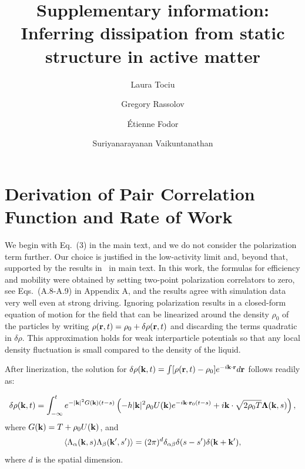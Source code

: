 \documentclass[superscriptaddress, amsmath,preprintnumbers,10pt,article,notitlepage]{revtex4-1}
\newcommand{\T}{T}
\newcommand{\U}{U}
\begin{document}
\title{Supplementary information: Inferring dissipation from static structure in active matter}

\author{Laura Tociu}
\author{Gregory Rassolov}

\author{\'Etienne Fodor}

\author{Suriyanarayanan Vaikuntanathan}

\maketitle

\section{Derivation of Pair Correlation Function and Rate of Work}
We begin with Eq.~(3) in the main text, and we do not consider the polarization term further. Our choice is justified in the low-activity limit and, beyond that, supported by the results in~\cite{Suri2020} in main text. In this work, the formulas for efficiency and mobility were obtained by setting two-point polarization correlators to zero, see Eqs.~(A.8-A.9) in Appendix A, and the results agree with simulation data very well even at strong driving. Ignoring polarization results in a closed-form equation of motion for the field that can be linearized around the density $\rho_0$ of the particles by writing $\rho ({\bf r}, t) = \rho_0 + \delta \rho({\bf r}, t)$ and discarding the terms quadratic in $\delta \rho$. This approximation holds for weak interparticle potentials so that any local density fluctuation is small compared to the density of the liquid. 

After linerization, the solution for $\delta \rho({\bf k}, t) = \int [ \rho({\bf r}, t) - \rho_0 ] e^{-i{\bf k} \cdot {\bf r}} d{\bf r}$ follows readily as:

\begin{equation}\label{eq:red_field_EOM_k}
\delta \rho( {\bf k}, t)  = \int_{-\infty}^t e^{-|{\bf k}|^2 G({\bf k}) (t-s)} \left( -h |{\bf k}|^2 \rho_0 \U({\bf k}) e^{-i{\bf k} \cdot {\bf r}_0(t - s)} + i{\bf k} \cdot \sqrt{2\rho_0 \T} \bm{\Lambda} ({\bf k}, s) \right) ,
\end{equation}
where $G({\bf k}) =  T + \rho_0U({\bf k})$, and 
\begin{equation}\label{eq:field_noise_k}
\langle \Lambda_{\alpha}({\bf k}, s)  \Lambda_{\beta}({\bf k}', s')  \rangle = (2\pi)^d \delta_{\alpha \beta}\delta(s-s')\delta({\bf k} + {\bf k}') ,
\end{equation}
where $d$ is the spatial dimension.
\end{document}

